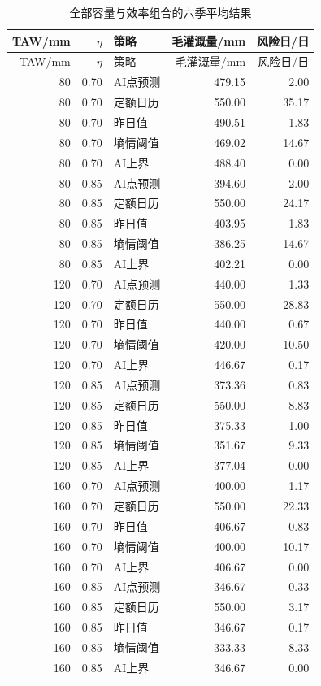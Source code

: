 \begin{longtable}{rrlrr}
\caption{全部容量与效率组合的六季平均结果}\label{tab:allsensitivity}\\\toprule
TAW/mm & $\eta$ & 策略 & 毛灌溉量/mm & 风险日/日\\\midrule\endfirsthead
\toprule TAW/mm & $\eta$ & 策略 & 毛灌溉量/mm & 风险日/日\\\midrule\endhead
80 & 0.70 & AI点预测 & 479.15 & 2.00 \\
80 & 0.70 & 定额日历 & 550.00 & 35.17 \\
80 & 0.70 & 昨日值 & 490.51 & 1.83 \\
80 & 0.70 & 墒情阈值 & 469.02 & 14.67 \\
80 & 0.70 & AI上界 & 488.40 & 0.00 \\
80 & 0.85 & AI点预测 & 394.60 & 2.00 \\
80 & 0.85 & 定额日历 & 550.00 & 24.17 \\
80 & 0.85 & 昨日值 & 403.95 & 1.83 \\
80 & 0.85 & 墒情阈值 & 386.25 & 14.67 \\
80 & 0.85 & AI上界 & 402.21 & 0.00 \\
120 & 0.70 & AI点预测 & 440.00 & 1.33 \\
120 & 0.70 & 定额日历 & 550.00 & 28.83 \\
120 & 0.70 & 昨日值 & 440.00 & 0.67 \\
120 & 0.70 & 墒情阈值 & 420.00 & 10.50 \\
120 & 0.70 & AI上界 & 446.67 & 0.17 \\
120 & 0.85 & AI点预测 & 373.36 & 0.83 \\
120 & 0.85 & 定额日历 & 550.00 & 8.83 \\
120 & 0.85 & 昨日值 & 375.33 & 1.00 \\
120 & 0.85 & 墒情阈值 & 351.67 & 9.33 \\
120 & 0.85 & AI上界 & 377.04 & 0.00 \\
160 & 0.70 & AI点预测 & 400.00 & 1.17 \\
160 & 0.70 & 定额日历 & 550.00 & 22.33 \\
160 & 0.70 & 昨日值 & 406.67 & 0.83 \\
160 & 0.70 & 墒情阈值 & 400.00 & 10.17 \\
160 & 0.70 & AI上界 & 406.67 & 0.00 \\
160 & 0.85 & AI点预测 & 346.67 & 0.33 \\
160 & 0.85 & 定额日历 & 550.00 & 3.17 \\
160 & 0.85 & 昨日值 & 346.67 & 0.17 \\
160 & 0.85 & 墒情阈值 & 333.33 & 8.33 \\
160 & 0.85 & AI上界 & 346.67 & 0.00 \\
\bottomrule
\end{longtable}
